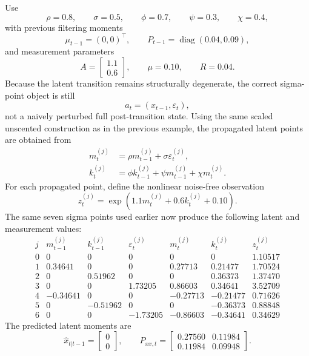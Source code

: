 Use
\[
  \rho = 0.8,
  \qquad
  \sigma = 0.5,
  \qquad
  \phi = 0.7,
  \qquad
  \psi = 0.3,
  \qquad
  \chi = 0.4,
\]
with previous filtering moments
\[
  \mu_{t-1}=(0,0)^\top,
  \qquad
  P_{t-1}=\operatorname{diag}(0.04,0.09),
\]
and measurement parameters
\[
  A=
  \begin{bmatrix}
    1.1\\ 0.6
  \end{bmatrix},
  \qquad
  \mu = 0.10,
  \qquad
  R = 0.04.
\]
Because the latent transition remains structurally degenerate, the correct
sigma-point object is still
\[
  a_t=(x_{t-1},\varepsilon_t),
\]
not a naively perturbed full post-transition state.  Using the same scaled
unscented construction as in the previous example, the propagated latent points
are obtained from
\begin{align}
  m_t^{(j)} &= \rho m_{t-1}^{(j)} + \sigma\varepsilon_t^{(j)},\\
  k_t^{(j)} &= \phi k_{t-1}^{(j)} + \psi m_{t-1}^{(j)} + \chi m_t^{(j)}.
\end{align}
For each propagated point, define the nonlinear noise-free observation
\[
  z_t^{(j)} = \exp\!\left(1.1 m_t^{(j)} + 0.6 k_t^{(j)} + 0.10\right).
\]
The same seven sigma points used earlier now produce the following latent and
measurement values:
\[
\begin{array}{c|rrr|rrr}
  j
  & m_{t-1}^{(j)} & k_{t-1}^{(j)} & \varepsilon_t^{(j)}
  & m_t^{(j)} & k_t^{(j)} & z_t^{(j)}\\
  \hline
  0 & 0 & 0 & 0 & 0 & 0 & 1.10517\\
  1 & 0.34641 & 0 & 0 & 0.27713 & 0.21477 & 1.70524\\
  2 & 0 & 0.51962 & 0 & 0 & 0.36373 & 1.37470\\
  3 & 0 & 0 & 1.73205 & 0.86603 & 0.34641 & 3.52709\\
  4 & -0.34641 & 0 & 0 & -0.27713 & -0.21477 & 0.71626\\
  5 & 0 & -0.51962 & 0 & 0 & -0.36373 & 0.88848\\
  6 & 0 & 0 & -1.73205 & -0.86603 & -0.34641 & 0.34629
\end{array}
\]
The predicted latent moments are
\[
  \hat x_{t|t-1}
  =
  \begin{bmatrix}
    0\\ 0
  \end{bmatrix},
  \qquad
  P_{xx,t}
  =
  \begin{bmatrix}
    0.27560 & 0.11984\\
    0.11984 & 0.09948
  \end{bmatrix}.
\]
